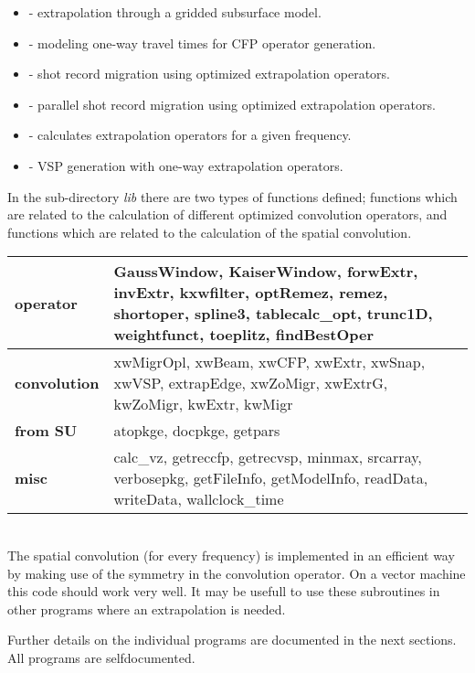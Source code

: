 \begin{itemize}
\item
{} - extrapolation through a gridded subsurface model.
\item
{} - modeling one-way travel times for CFP operator generation.
\item
{} - shot record migration using optimized extrapolation operators.
\item
{} - parallel shot record migration using optimized extrapolation operators.
\item
{} - calculates extrapolation operators for a given frequency.
\item
{} - VSP generation with one-way extrapolation operators.
\end{itemize}

In the sub-directory {\it lib} there are two types of functions defined; functions which are related to the calculation of different optimized convolution operators, and functions which are related to the calculation of the spatial convolution.

\begin{tabular} {| p{2.2cm} | p{9cm} |}
\hline {\bf operator} & GaussWindow, KaiserWindow, forwExtr, invExtr, kxwfilter, optRemez, remez, shortoper, spline3,
tablecalc\_opt, trunc1D, weightfunct, toeplitz, findBestOper \\ \hline \hline 
{\bf convolution} & xwMigrOpl, xwBeam, xwCFP, xwExtr, xwSnap, xwVSP, extrapEdge, xwZoMigr, xwExtrG, kwZoMigr, kwExtr, kwMigr \\ \hline \hline 
{\bf from SU} & atopkge, docpkge, getpars \\ \hline \hline 
{\bf misc} & calc\_vz, getreccfp, getrecvsp, minmax, srcarray, verbosepkg, getFileInfo, getModelInfo, readData, writeData,
wallclock\_time
\\ \hline
\end{tabular}
\\

The spatial convolution (for every frequency) is implemented in an efficient way by making use of the symmetry in the convolution operator. 
On a vector machine this code should work very well. 
It may be usefull to use these subroutines in other programs where an extrapolation is needed.

Further details on the individual programs are documented in the next sections. All programs are selfdocumented.

